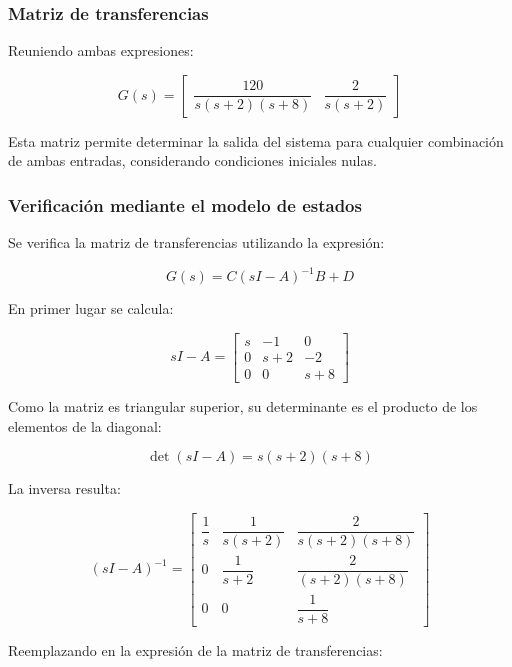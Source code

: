 \documentclass[12pt,a4paper]{article}
\begin{document}
\subsubsection*{Matriz de transferencias}
Reuniendo ambas expresiones:

\begin{equation}\boxed{G(s)=\begin{bmatrix}\dfrac{120}{s(s+2)(s+8)}&\dfrac{2}{s(s+2)}\end{bmatrix}}\end{equation}

Esta matriz permite determinar la salida del sistema para cualquier combinación de ambas entradas, considerando condiciones iniciales nulas.
\subsubsection*{Verificación mediante el modelo de estados}
Se verifica la matriz de transferencias utilizando la expresión:

\begin{equation}G(s)=C(sI-A)^{-1}B+D\end{equation}

En primer lugar se calcula:

\begin{equation}sI-A=\begin{bmatrix}s&-1&0\\0&s+2&-2\\0&0&s+8\end{bmatrix}\end{equation}

Como la matriz es triangular superior, su determinante es el producto de los elementos de la diagonal:

\begin{equation}\det(sI-A)=s(s+2)(s+8)\end{equation}

La inversa resulta:

\begin{equation}(sI-A)^{-1}=\begin{bmatrix}\dfrac{1}{s}&\dfrac{1}{s(s+2)}&\dfrac{2}{s(s+2)(s+8)}\\[8pt]0&\dfrac{1}{s+2}&\dfrac{2}{(s+2)(s+8)}\\[8pt]0&0&\dfrac{1}{s+8}\end{bmatrix}\end{equation}

Reemplazando en la expresión de la matriz de transferencias:
\end{document}
